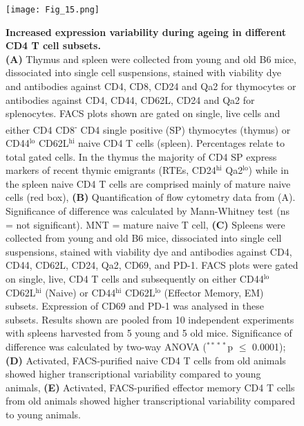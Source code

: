 \begin{figure}[!ht]
\centering
\texttt{[image: Fig\_15.png]}
\caption[Increased expression variability during ageing in different CD4\plus{} T cell subsets]{\textbf{Increased expression variability during ageing in different CD4\plus{} T cell subsets.} \\
\textbf{(A)} Thymus and spleen were collected from young and old B6 mice, dissociated into single cell suspensions, stained with viability dye and antibodies against CD4, CD8, CD24 and Qa2 for thymocytes or antibodies against CD4, CD44, CD62L, CD24 and Qa2 for splenocytes. FACS plots shown are gated on single, live cells and either CD4\plus{} CD8\textsuperscript{-} CD4 single positive (SP) thymocytes (thymus) or CD44$^\text{lo}$ CD62L$^\text{hi}$ naive CD4\plus{} T cells (spleen). Percentages relate to total gated cells. In the thymus the majority of CD4 SP express markers of recent thymic emigrants (RTEs, CD24$^\text{hi}$ Qa2$^\text{lo}$) while in the spleen naive CD4\plus{} T cells are comprised mainly of mature naive cells (red box), \textbf{(B)} Quantification of flow cytometry data from (A). Significance of difference was calculated by Mann-Whitney test (ns = not significant). MNT = mature naive T cell, \textbf{(C)} Spleens were collected from young and old B6 mice, dissociated into single cell suspensions, stained with viability dye and antibodies against CD4, CD44, CD62L, CD24, Qa2, CD69, and PD-1. FACS plots were gated on single, live, CD4\plus{} T cells and subsequently on either CD44$^\text{lo}$ CD62L$^\text{hi}$ (Naive) or CD44$^\text{hi}$ CD62L$^\text{lo}$ (Effector Memory, EM) subsets. Expression of CD69 and PD-1 was analysed in these subsets. Results shown are pooled from 10 independent experiments with spleens harvested from 5 young and 5 old mice. Significance of difference was calculated by two-way ANOVA ($^{\ast{}\ast{}\ast{}\ast}$p $\leq$ 0.0001); \textbf{(D)} Activated, FACS-purified naive CD4\plus{} T cells from old animals showed higher transcriptional variability compared to young animals, \textbf{(E)} Activated, FACS-purified effector memory CD4\plus{} T cells from old animals showed higher transcriptional variability compared to young animals.}
\label{fig1:EM_Naive_CD4}
\end{figure}

